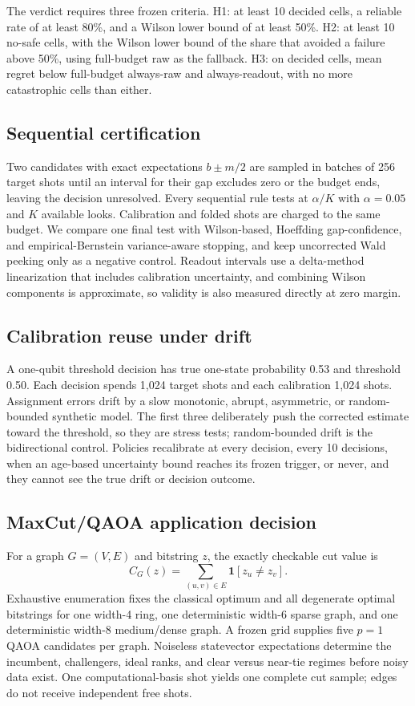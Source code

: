 \documentclass[10pt,twocolumn]{article}
\begin{document}
The verdict requires three frozen criteria. H1: at least 10 decided cells, a reliable rate of at
least 80\%, and a Wilson lower bound of at least 50\%. H2: at least 10 no-safe cells, with the
Wilson lower bound of the share that avoided a failure above 50\%, using full-budget raw as the
fallback. H3: on decided cells, mean regret below full-budget always-raw and always-readout, with
no more catastrophic cells than either.

\subsection{Sequential certification}
Two candidates with exact expectations $b\pm m/2$ are sampled in batches of 256 target
shots until an interval for their gap excludes zero or the budget ends, leaving the
decision unresolved. Every sequential rule tests at $\alpha/K$ with $\alpha=0.05$ and
$K$ available looks. Calibration and folded shots are charged to the same budget. We
compare one final test with Wilson-based, Hoeffding gap-confidence, and
empirical-Bernstein variance-aware stopping, and keep uncorrected Wald peeking only as a
negative control. Readout intervals use a delta-method linearization that includes
calibration uncertainty, and combining Wilson components is approximate, so validity is
also measured directly at zero margin.

\subsection{Calibration reuse under drift}
A one-qubit threshold decision has true one-state probability 0.53 and threshold 0.50.
Each decision spends 1,024 target shots and each calibration 1,024 shots. Assignment
errors drift by a slow monotonic, abrupt, asymmetric, or random-bounded synthetic model.
The first three deliberately push the corrected estimate toward the threshold, so they
are stress tests; random-bounded drift is the bidirectional control. Policies recalibrate
at every decision, every 10 decisions, when an age-based uncertainty bound reaches its
frozen trigger, or never, and they cannot see the true drift or decision outcome.

\subsection{MaxCut/QAOA application decision}
For a graph $G=(V,E)$ and bitstring $z$, the exactly checkable cut value is
\begin{equation}
C_G(z)=\sum_{(u,v)\in E}\mathbf{1}[z_u\ne z_v].
\end{equation}
Exhaustive enumeration fixes the classical optimum and all degenerate optimal
bitstrings for one width-4 ring, one deterministic width-6 sparse graph, and one
deterministic width-8 medium/dense graph. A frozen grid supplies five $p=1$ QAOA
candidates per graph. Noiseless statevector expectations determine the incumbent,
challengers, ideal ranks, and clear versus near-tie regimes before noisy data exist.
One computational-basis shot yields one complete cut sample; edges do not receive
independent free shots.
\end{document}
